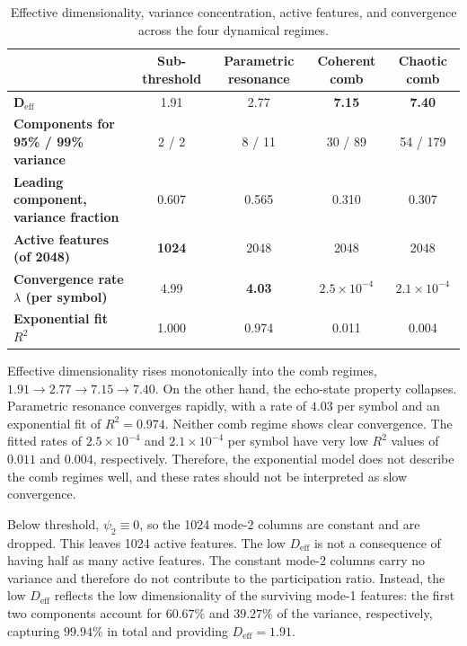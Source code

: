 \documentclass{ar2rc}
\begin{document}
\begin{table}[htbp]
	\centering
	\caption{Effective dimensionality, variance concentration, active features, and convergence across the four dynamical regimes.}
	\label{tab:dimensionality_convergence}
	\begin{tabular}{lcccc}
		\hline
		\textbf{} & \textbf{Sub-threshold} & \textbf{Parametric resonance} & \textbf{Coherent comb} & \textbf{Chaotic comb} \\
		\hline
		$\mathbf{D_{\mathrm{eff}}}$
		& 1.91
		& 2.77
		& \textbf{7.15}
		& \textbf{7.40} \\

		\textbf{Components for 95\% / 99\% variance}
		& 2 / 2
		& 8 / 11
		& 30 / 89
		& 54 / 179 \\

		\textbf{Leading component, variance fraction}
		& 0.607
		& 0.565
		& 0.310
		& 0.307 \\

		\textbf{Active features (of 2048)}
		& \textbf{1024}
		& 2048
		& 2048
		& 2048 \\

		\textbf{Convergence rate $\lambda$ (per symbol)}
		& 4.99
		& \textbf{4.03}
		& $2.5\times10^{-4}$
		& $2.1\times10^{-4}$ \\

		\textbf{Exponential fit $R^2$}
		& 1.000
		& 0.974
		& 0.011
		& 0.004 \\
		\hline
	\end{tabular}
\end{table}

Effective dimensionality rises monotonically into the comb regimes, $1.91 \rightarrow 2.77 \rightarrow 7.15 \rightarrow 7.40$. On the other hand, the echo-state property collapses. Parametric resonance converges rapidly, with a rate of $4.03$ per symbol and an exponential fit of $R^2 = 0.974$. Neither comb regime shows clear convergence. The fitted rates of $2.5 \times 10^{-4}$ and $2.1 \times 10^{-4}$ per symbol have very low $R^2$ values of $0.011$ and $0.004$, respectively. Therefore, the exponential model does not describe the comb regimes well, and these rates should not be interpreted as slow convergence.

Below threshold, $\psi_2 \equiv 0$, so the 1024 mode-2 columns are constant and are dropped. This leaves 1024 active features. The low $D_{\mathrm{eff}}$ is not a consequence of having half as many active features. The constant mode-2 columns carry no variance and therefore do not contribute to the participation ratio. Instead, the low $D_{\mathrm{eff}}$ reflects the low dimensionality of the surviving mode-1 features: the first two components account for $60.67\%$ and $39.27\%$ of the variance, respectively, capturing $99.94\%$ in total and providing $D_{\mathrm{eff}} = 1.91$.
\end{document}
